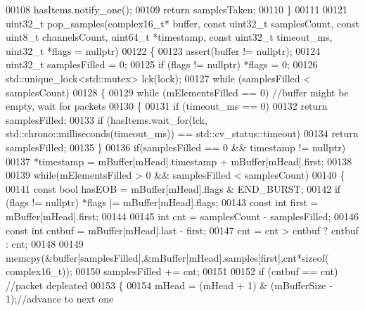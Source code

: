 \begin{DoxyCode}
00108         hasItems.notify\_one();
00109         \textcolor{keywordflow}{return} samplesTaken;
00110     \}
00111 
00121     uint32\_t pop_samples(complex16_t* buffer, \textcolor{keyword}{const} uint32\_t samplesCount, \textcolor{keyword}{const} uint8\_t channelsCount, 
      uint64\_t *timestamp, \textcolor{keyword}{const} uint32\_t timeout_ms, uint32\_t *flags = \textcolor{keyword}{nullptr})
00122     \{
00123         assert(buffer != \textcolor{keyword}{nullptr});
00124         uint32\_t samplesFilled = 0;
00125         \textcolor{keywordflow}{if} (flags != \textcolor{keyword}{nullptr}) *flags = 0;
00126         std::unique\_lock<std::mutex> lck(lock);
00127         \textcolor{keywordflow}{while} (samplesFilled < samplesCount)
00128         \{
00129             \textcolor{keywordflow}{while} (mElementsFilled == 0) \textcolor{comment}{//buffer might be empty, wait for packets}
00130             \{
00131                 \textcolor{keywordflow}{if} (timeout\_ms == 0)
00132                     \textcolor{keywordflow}{return} samplesFilled;
00133                 \textcolor{keywordflow}{if} (hasItems.wait\_for(lck, std::chrono::milliseconds(timeout\_ms)) == 
      std::cv\_status::timeout)
00134                     \textcolor{keywordflow}{return} samplesFilled;
00135             \}
00136             \textcolor{keywordflow}{if}(samplesFilled == 0 && timestamp != \textcolor{keyword}{nullptr})
00137                 *timestamp = mBuffer[mHead].timestamp + mBuffer[mHead].first;
00138 
00139             \textcolor{keywordflow}{while}(mElementsFilled > 0 && samplesFilled < samplesCount)
00140             \{
00141                 \textcolor{keyword}{const} \textcolor{keywordtype}{bool} hasEOB = mBuffer[mHead].flags & END_BURST;
00142                 \textcolor{keywordflow}{if} (flags != \textcolor{keyword}{nullptr}) *flags |= mBuffer[mHead].flags;
00143                 \textcolor{keyword}{const} \textcolor{keywordtype}{int} first = mBuffer[mHead].first;
00144 
00145                 \textcolor{keywordtype}{int} cnt = samplesCount - samplesFilled;
00146                 \textcolor{keyword}{const} \textcolor{keywordtype}{int} cntbuf = mBuffer[mHead].last - first;
00147                 cnt = cnt > cntbuf ? cntbuf : cnt;
00148 
00149                 memcpy(&buffer[samplesFilled],&mBuffer[mHead].samples[first],cnt*\textcolor{keyword}{sizeof}(
      complex16_t));
00150                 samplesFilled += cnt;
00151 
00152                 \textcolor{keywordflow}{if} (cntbuf == cnt) \textcolor{comment}{//packet depleated}
00153                 \{
00154                     mHead = (mHead + 1) & (mBufferSize - 1);\textcolor{comment}{//advance to next one}

\end{DoxyCode}
